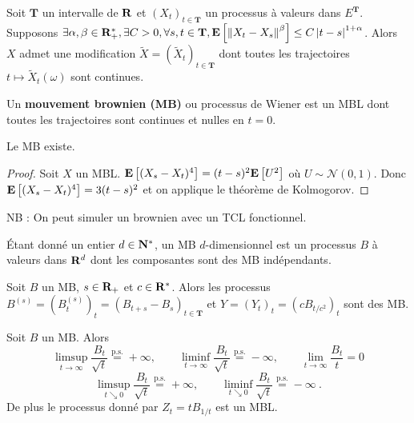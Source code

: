 	\begin{thm}[Kolmogorov]
		Soit $\mathbf{T}$ un intervalle de $\mathbf{R}$ et $(X_t)_{t \in \mathbf{T}}$ un processus à valeurs dans $E^{\mathbf{T}}$.
		Supposons $\exists \alpha,\beta \in \mathbf{R}_+^*, \exists C > 0, \forall s,t \in \mathbf{T}, \mathbf{E} \left[ \left\lVert X_t - X_s\right\rVert^\beta \right] \leq C \left\lvert t - s\right\rvert^{1 + \alpha}$.
		Alors $X$ admet une modification $\tilde{X} = \left( \tilde{X}_t \right)_{t \in \mathbf{T}}$ dont toutes les trajectoires $t \mapsto \tilde{X}_t(\omega)$ sont continues.
	\end{thm}
	
	\begin{defn}
		Un \textbf{mouvement brownien (MB)} ou processus de Wiener est un MBL dont toutes les trajectoires sont continues et nulles en $t = 0$.
	\end{defn}
	
	\begin{pop}
		Le MB existe.
	\end{pop}
	
	\begin{proof}
		Soit $X$ un MBL.
		$\mathbf{E} \left[ (X_s - X_t)^4 \right] = (t - s)^2 \mathbf{E} \left[ U^2 \right]$ où $U \sim \mathcal{N}(0,1)$.
		Donc $\mathbf{E} \left[ (X_s - X_t)^4 \right] = 3(t - s)^2$ et on applique le théorème de Kolmogorov.
	\end{proof}
	
	NB : On peut simuler un brownien avec un TCL fonctionnel.
	
	\begin{defn}
		Étant donné un entier $d \in \mathbf{N}^*$, un MB $d$-dimensionnel est un processus $B$ à valeurs dans $\mathbf{R}^d$ dont les composantes sont des MB indépendants.
	\end{defn}
	
	\begin{pop}
		Soit $B$ un MB, $s \in \mathbf{R}_+$ et $c \in \mathbf{R}^*$.
		Alors les processus $B^{(s)} = (B_t^{(s)})_t = (B_{t + s} - B_s)_{t \in \mathbf{T}}$ et $Y = (Y_t)_t = \left( c B_{t/c^2} \right)_t$ sont des MB.
	\end{pop}
	
	\begin{pop}
		Soit $B$ un MB.
		Alors
		$$\limsup_{t \to \infty} \frac{B_t}{\sqrt{t}} \overset{\text{p.s.}}{=} +\infty,\qquad
		\liminf_{t \to \infty} \frac{B_t}{\sqrt{t}} \overset{\text{p.s.}}{=} -\infty,\qquad
		\lim_{t \to \infty} \frac{B_t}{t} = 0$$
		$$\limsup_{t \searrow 0} \frac{B_t}{\sqrt{t}} \overset{\text{p.s.}}{=} +\infty,\qquad
		\liminf_{t \searrow 0} \frac{B_t}{\sqrt{t}} \overset{\text{p.s.}}{=} -\infty\ .$$
		De plus le processus donné par $Z_t = t B_{1/t}$ est un MBL.
	\end{pop}
	
